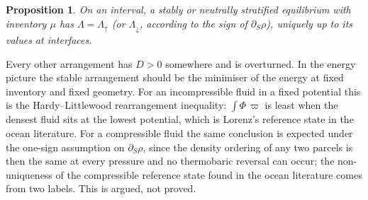 \documentclass[11pt]{article}
\newtheorem{proposition}{Proposition}
\theoremstyle{definition}
\theoremstyle{remark}
\begin{document}
\begin{proposition}
\label{prop:stable-arrangement}
On an interval, a stably or neutrally stratified equilibrium with
inventory $\mu$ has $\Lambda = \Lambda_\uparrow$ (or $\Lambda_\downarrow$,
according to the sign of $\partial_S\rho$), uniquely up to its values
at interfaces.
\end{proposition}

Every other arrangement has $D > 0$ somewhere and is overturned. In
the energy picture the stable arrangement should be the minimiser of
the energy at fixed inventory and fixed geometry. For an
incompressible fluid in a fixed potential this is the
Hardy--Littlewood rearrangement inequality: $\int\Phi\,\varpi$ is least
when the densest fluid sits at the lowest potential, which is
Lorenz's reference state in the ocean literature. For a compressible
fluid the same conclusion is expected under the one-sign assumption on
$\partial_S\rho$, since the density ordering of any two parcels is then
the same at every pressure and no thermobaric reversal can occur; the
non-uniqueness of the compressible reference state found in the ocean
literature comes from two labels. This is argued, not proved.
\end{document}
